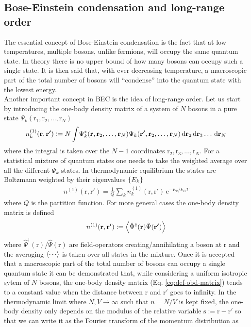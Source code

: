 \documentclass[12pt,a4paper,twosides]{book}
\renewcommand{\vec}[1]{\bm{\mathrm{#1}}}
\newcommand{\unit}[1]{\,\mathrm{#1}}
\newcommand{\diff}[1]{\,\mathrm{d}{\vec{#1}}}
\begin{document}
		\subsection{Bose-Einstein condensation and long-range order}
			The essential concept of Bose-Einstein condensation is the fact that at low temperatures, multiple bosons, unlike fermions, will occupy the same quantum state. In theory there is no upper bound of how many bosons can occupy such a single state. It is then said that, with ever decreasing temperature, a macroscopic part of the total number of bosons will ``condense'' into the quantum state with the lowest energy.\\			
			
			Another important concept in BEC is the idea of long-range order. Let us start by introducing the one-body density matrix of a system of $N$ bosons in a pure state $\Psi_k(\vec{r}_1,\vec{r}_2,\ldots,\vec{r}_N)$
			\begin{align}
				n^{(1)}_k(\vec{r},\vec{r'}) \vcentcolon= N\int\!	\Psi_k^*(\vec{r},\vec{r}_2,\ldots,\vec{r}_N)\Psi_k(\vec{r'},\vec{r}_2,\ldots,\vec{r}_N)\diff{r}_2\diff{r}_3\ldots\diff{r}_N	\label{eq:def-obd-matrix}
			\end{align}
			where the integral is taken over the $N-1$ coordinates $\vec{r}_2,\vec{r}_3,\ldots,\vec{r}_N$. For a statistical mixture of quantum states one needs to take the weighted average over all the different $\Psi_k$-states. In thermodynamic equilibrium the states are Boltzmann weighted by their eigenvalues $\qty{E_k}$
			\begin{align}
				n^{(1)}(\vec{r},\vec{r'}) = \frac{1}{Q}\sum_k n^{(1)}_k(\vec{r},\vec{r'}) \unit{e}^{-E_k/k_BT}
			\end{align}
			where $Q$ is the partition function. For more general cases the one-body density matrix is defined
			\begin{align}
				n^{(1)}(\vec{r},\vec{r'}) \vcentcolon=\expval{\hat\Psi^\dagger(\vec{r})\hat\Psi(\vec{r'})}
			\end{align}
			where $\hat\Psi^\dagger(\vec{r})$/$\hat\Psi(\vec{r})$ are field-operators creating/annihilating a boson at $\vec{r}$ and the averaging $\expval{\cdots}$ is taken over all states in the mixture. Once it is accepted that a macroscopic part of the total number of bosons can occupy a single quantum state it can be demonstrated that, while considering a uniform isotropic sytem of $N$ bosons, the one-body density matrix (Eq. \ref{eq:def-obd-matrix}) tends to a constant value when the distance between $\vec{r}$ and $\vec{r}'$ goes to infinity. In the thermodynamic limit where $N,V\rightarrow\infty$ such that $n=N/V$ is kept fixed, the one-body density only depends on the modulus of the relative variable $\vec{s}:=\vec{r}-\vec{r}'$ so that we can write it as the Fourier transform of the momentum distribution as
\end{document}
